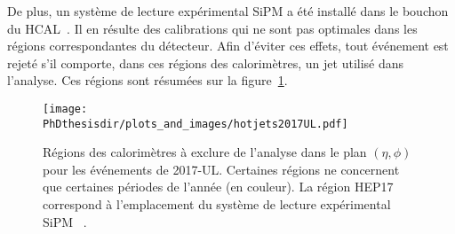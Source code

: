 De plus, un système de lecture expérimental \og SiPM \fg{} a été installé dans le bouchon du HCAL~\cite{SiPM_CMS_conf}.
Il en résulte des calibrations qui ne sont pas optimales dans les régions correspondantes du détecteur.
Afin d'éviter ces effets, tout événement est rejeté s'il comporte, dans ces régions des calorimètres, un jet utilisé dans l'analyse.
Ces régions sont résumées sur la figure~\ref{fig-hotjets2017UL}.
\begin{figure}[h]
\centering
\texttt{[image: \\PhDthesisdir/plots\_and\_images/hotjets2017UL.pdf]}
\caption[Régions des calorimètres à exclure de l'analyse dans le plan $(\eta, \phi)$.]{Régions des calorimètres à exclure de l'analyse dans le plan $(\eta, \phi)$ pour les événements de 2017-UL. Certaines régions ne concernent que certaines périodes de l'année (en couleur). La région \og HEP17 \fg{} correspond à l'emplacement du système de lecture expérimental \og SiPM \fg~\cite{SiPM_CMS_conf}.}
\label{fig-hotjets2017UL}
\end{figure}
%
%
%
